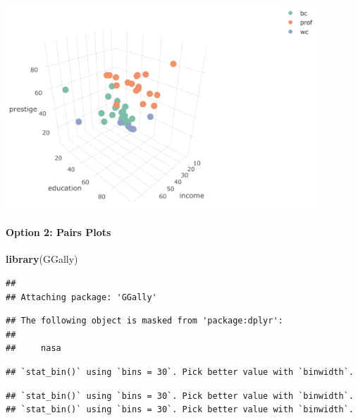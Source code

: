 \documentclass[]{extarticle}
\newenvironment{Shaded}{\begin{snugshade}}{\end{snugshade}}
\newcommand{\KeywordTok}[1]{\textcolor[rgb]{0.13,0.29,0.53}{\textbf{#1}}}
\newcommand{\StringTok}[1]{\textcolor[rgb]{0.31,0.60,0.02}{#1}}
\newcommand{\OperatorTok}[1]{\textcolor[rgb]{0.81,0.36,0.00}{\textbf{#1}}}
\newcommand{\NormalTok}[1]{#1}
\let\oldparagraph\paragraph
\renewcommand{\paragraph}[1]{\oldparagraph{#1}\mbox{}}
\begin{document}
\includegraphics[height=3in]{plotly_screenshot.png}

\newpage

\paragraph{Option 2: Pairs Plots}\label{option-2-pairs-plots}

\begin{Shaded}
\begin{Highlighting}[]
\KeywordTok{library}\NormalTok{(GGally)}
\end{Highlighting}
\end{Shaded}

\begin{verbatim}
## 
## Attaching package: 'GGally'
\end{verbatim}

\begin{verbatim}
## The following object is masked from 'package:dplyr':
## 
##     nasa
\end{verbatim}

\begin{Shaded}
\end{Shaded}

\begin{verbatim}
## `stat_bin()` using `bins = 30`. Pick better value with `binwidth`.
\end{verbatim}

\begin{verbatim}
## `stat_bin()` using `bins = 30`. Pick better value with `binwidth`.
## `stat_bin()` using `bins = 30`. Pick better value with `binwidth`.
\end{verbatim}
\end{document}
